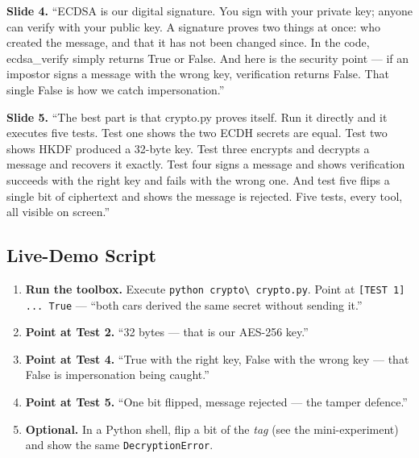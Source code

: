 \documentclass[11pt,a4paper]{report}
\begin{document}
\textbf{Slide 4.} ``ECDSA is our digital signature. You sign with your private
key; anyone can verify with your public key. A signature proves two things at
once: who created the message, and that it has not been changed since. In the
code, ecdsa\_verify simply returns True or False. And here is the security point
--- if an impostor signs a message with the wrong key, verification returns
False. That single False is how we catch impersonation.''

\textbf{Slide 5.} ``The best part is that crypto.py proves itself. Run it
directly and it executes five tests. Test one shows the two ECDH secrets are
equal. Test two shows HKDF produced a 32-byte key. Test three encrypts and
decrypts a message and recovers it exactly. Test four signs a message and shows
verification succeeds with the right key and fails with the wrong one. And test
five flips a single bit of ciphertext and shows the message is rejected. Five
tests, every tool, all visible on screen.''

\subsection{Live-Demo Script}
\begin{enumerate}
  \item \textbf{Run the toolbox.} Execute \texttt{python crypto\textbackslash
        crypto.py}. Point at \texttt{[TEST 1] ... True} --- ``both cars derived
        the same secret without sending it.''
  \item \textbf{Point at Test 2.} ``32 bytes --- that is our AES-256 key.''
  \item \textbf{Point at Test 4.} ``True with the right key, False with the
        wrong key --- that False is impersonation being caught.''
  \item \textbf{Point at Test 5.} ``One bit flipped, message rejected --- the
        tamper defence.''
  \item \textbf{Optional.} In a Python shell, flip a bit of the \emph{tag} (see
        the mini-experiment) and show the same \texttt{DecryptionError}.
\end{enumerate}
\end{document}
